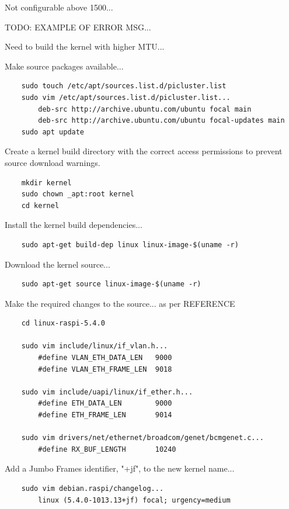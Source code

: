 \documentclass{article}
\begin{document}
Not configurable above 1500...

TODO: EXAMPLE OF ERROR MSG...

Need to build the kernel with higher MTU...


Make source packages available...

\begin{verbatim}
    sudo touch /etc/apt/sources.list.d/picluster.list
    sudo vim /etc/apt/sources.list.d/picluster.list...
        deb-src http://archive.ubuntu.com/ubuntu focal main
        deb-src http://archive.ubuntu.com/ubuntu focal-updates main
    sudo apt update
\end{verbatim}

Create a kernel build directory with the correct access permissions to prevent source download warnings. 

\begin{verbatim}
    mkdir kernel
    sudo chown _apt:root kernel
    cd kernel
\end{verbatim}

Install the kernel build dependencies...

\begin{verbatim}
    sudo apt-get build-dep linux linux-image-$(uname -r)
\end{verbatim}

Download the kernel source...

\begin{verbatim}
    sudo apt-get source linux-image-$(uname -r)
\end{verbatim}

Make the required changes to the source... as per REFERENCE

\begin{verbatim}
    cd linux-raspi-5.4.0 

    sudo vim include/linux/if_vlan.h...
        #define VLAN_ETH_DATA_LEN   9000
        #define VLAN_ETH_FRAME_LEN  9018
    
    sudo vim include/uapi/linux/if_ether.h...
        #define ETH_DATA_LEN        9000
        #define ETH_FRAME_LEN       9014
    
    sudo vim drivers/net/ethernet/broadcom/genet/bcmgenet.c...
        #define RX_BUF_LENGTH       10240
\end{verbatim}

Add a Jumbo Frames identifier, "+jf", to the new kernel name...

\begin{verbatim}
    sudo vim debian.raspi/changelog...
        linux (5.4.0-1013.13+jf) focal; urgency=medium
        
\end{verbatim}
\end{document}
